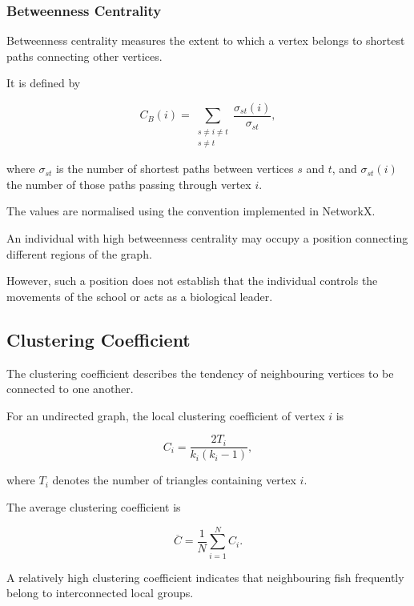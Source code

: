 \documentclass[10pt,a4paper]{article}
\begin{document}
\subsubsection{Betweenness Centrality}

Betweenness centrality measures the extent to which
a vertex belongs to shortest paths connecting other
vertices.

It is defined by

\begin{equation}
C_B(i)=
\sum_{\substack{s\neq i\neq t\\s\neq t}}
\frac{\sigma_{st}(i)}{\sigma_{st}},
\end{equation}

where $\sigma_{st}$ is the number of shortest paths
between vertices $s$ and $t$, and $\sigma_{st}(i)$
the number of those paths passing through vertex $i$.

The values are normalised using the convention
implemented in NetworkX.

An individual with high betweenness centrality may
occupy a position connecting different regions of
the graph.

However, such a position does not establish that
the individual controls the movements of the school
or acts as a biological leader.

\subsection{Clustering Coefficient}

The clustering coefficient describes the tendency
of neighbouring vertices to be connected to one
another.

For an undirected graph, the local clustering
coefficient of vertex $i$ is

\begin{equation}
C_i=
\frac{2T_i}{k_i(k_i-1)},
\end{equation}

where $T_i$ denotes the number of triangles
containing vertex $i$.

The average clustering coefficient is

\begin{equation}
\overline{C}=
\frac{1}{N}\sum_{i=1}^{N}C_i.
\end{equation}

A relatively high clustering coefficient indicates
that neighbouring fish frequently belong to
interconnected local groups.
\end{document}
